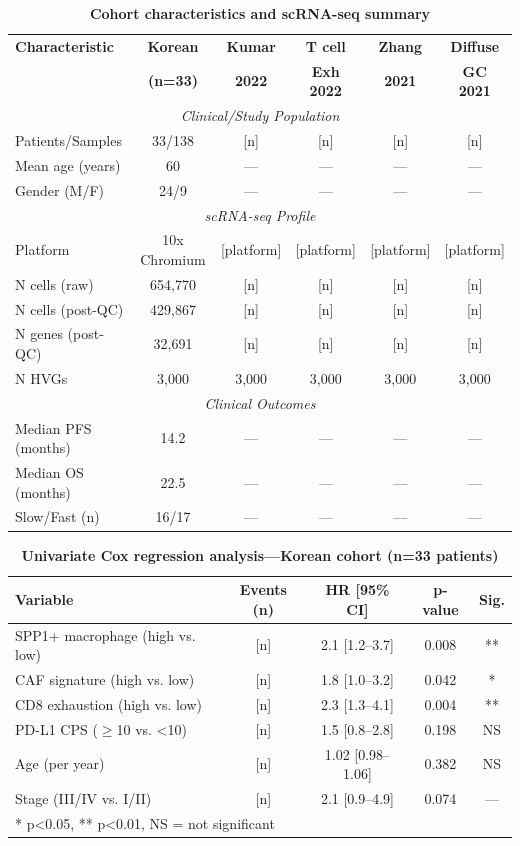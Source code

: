 \documentclass[12pt,twoside]{article}
\begin{document}
\begin{table}[H]
\centering
\caption{\textbf{Cohort characteristics and scRNA-seq summary}}
\label{tab:1}
\small
\begin{tabular}{l c c c c c}
\toprule
\textbf{Characteristic} & \textbf{Korean} & \textbf{Kumar} & \textbf{T cell} & \textbf{Zhang} & \textbf{Diffuse} \\
& \textbf{(n=33)} & \textbf{2022} & \textbf{Exh 2022} & \textbf{2021} & \textbf{GC 2021} \\
\midrule
\multicolumn{6}{c}{\textit{Clinical/Study Population}} \\
Patients/Samples & 33/138 & [n] & [n] & [n] & [n] \\
Mean age (years) & 60 & — & — & — & — \\
Gender (M/F) & 24/9 & — & — & — & — \\
\midrule
\multicolumn{6}{c}{\textit{scRNA-seq Profile}} \\
Platform & 10x Chromium & [platform] & [platform] & [platform] & [platform] \\
N cells (raw) & 654,770 & [n] & [n] & [n] & [n] \\
N cells (post-QC) & 429,867 & [n] & [n] & [n] & [n] \\
N genes (post-QC) & 32,691 & [n] & [n] & [n] & [n] \\
N HVGs & 3,000 & 3,000 & 3,000 & 3,000 & 3,000 \\
\midrule
\multicolumn{6}{c}{\textit{Clinical Outcomes}} \\
Median PFS (months) & 14.2 & — & — & — & — \\
Median OS (months) & 22.5 & — & — & — & — \\
Slow/Fast (n) & 16/17 & — & — & — & — \\
\bottomrule
\end{tabular}
\end{table}

\begin{table}[H]
\centering
\caption{\textbf{Univariate Cox regression analysis—Korean cohort (n=33 patients)}}
\label{tab:2}
\small
\begin{tabular}{l c c c c}
\toprule
\textbf{Variable} & \textbf{Events (n)} & \textbf{HR [95\% CI]} & \textbf{p-value} & \textbf{Sig.} \\
\midrule
SPP1+ macrophage (high vs. low) & [n] & 2.1 [1.2--3.7] & 0.008 & ** \\
CAF signature (high vs. low) & [n] & 1.8 [1.0--3.2] & 0.042 & * \\
CD8 exhaustion (high vs. low) & [n] & 2.3 [1.3--4.1] & 0.004 & ** \\
PD-L1 CPS ($\geq$10 vs. <10) & [n] & 1.5 [0.8--2.8] & 0.198 & NS \\
Age (per year) & [n] & 1.02 [0.98--1.06] & 0.382 & NS \\
Stage (III/IV vs. I/II) & [n] & 2.1 [0.9--4.9] & 0.074 & --- \\
\bottomrule
\multicolumn{5}{l}{* p<0.05, ** p<0.01, NS = not significant} \\
\end{tabular}
\end{table}
\end{document}
